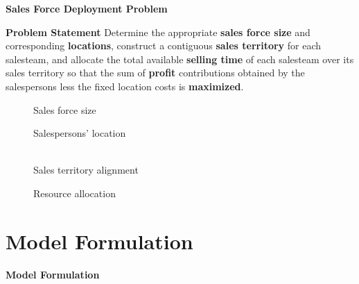 \begin{frame}{\textbf{Sales Force Deployment Problem}}
\begin{block}{\textbf{Problem Statement}}
Determine the appropriate \textbf{sales force size} and corresponding \textbf{locations}, construct a
contiguous \textbf{sales territory} for each salesteam, and allocate the total available
\textbf{selling time} of each salesteam over its sales territory so that the sum of \textbf{profit}
contributions obtained by the salespersons less the fixed location costs is \textbf{maximized}.
\end{block}
\begin{figure}
\centering
 \begin{minipage}[b]{0.2\linewidth} \centering
  
	\footnotesize Sales force size 
 \end{minipage}
 \begin{minipage}[b]{0.2\linewidth} \centering
	
	\footnotesize Salespersons' location
	\end{minipage}
	\begin{minipage}[b]{0.25\linewidth} \centering
	\\
	\footnotesize Sales territory alignment
	\end{minipage}
	\begin{minipage}[b]{0.2\linewidth} \centering
	
	\footnotesize Resource allocation
	\end{minipage}
\end{figure}


\end{frame}


\section{Model Formulation}
\begin{frame}
\begin{center}
{\LARGE \textbf{Model Formulation}}
\end{center}
\end{frame}

